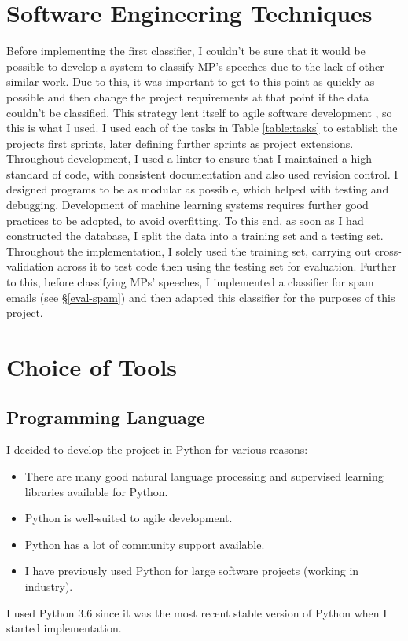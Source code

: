 \documentclass[12pt,a4paper,twoside,openright]{report}
\begin{document}
\section{Software Engineering Techniques} \label{prep-sweng}
	
Before implementing the first classifier, I couldn't be sure that it would be possible to develop a system to classify MP's speeches due to the lack of other similar work. Due to this, it was important to get to this point as quickly as possible and then change the project requirements at that point if the data couldn't be classified. This strategy lent itself to agile software development \cite{agile}, so this is what I used. I used each of the tasks in Table \ref{table:tasks} to establish the projects first sprints, later defining further sprints as project extensions.
\newline
\newline
Throughout development, I used a linter to ensure that I maintained a high standard of code, with consistent documentation and also used revision control. I designed programs to be as modular as possible, which helped with testing and debugging.
\newline
\newline
Development of machine learning systems requires further good practices to be adopted, to avoid overfitting. To this end, as soon as I had constructed the database, I split the data into a training set and a testing set. Throughout the implementation, I solely used the training set, carrying out cross-validation across it to test code then using the testing set for evaluation. Further to this, before classifying MPs' speeches, I implemented a classifier for spam emails (see \S\ref{eval-spam}) and then adapted this classifier for the purposes of this project.


\section{Choice of Tools} \label{prep-tools}

\subsection{Programming Language}

I decided to develop the project in Python for various reasons:
\begin{itemize}
	\item There are many good natural language processing and supervised learning libraries available for Python.
	\item Python is well-suited to agile development.
	\item Python has a lot of community support available.
	\item I have previously used Python for large software projects (working in industry).
\end{itemize}
I used Python 3.6 since it was the most recent stable version of Python when I started implementation.
\end{document}
